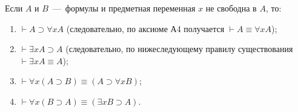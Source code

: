 \begin{lemma}
    Если $A$ и $B$~---~формулы и предметная переменная $x$ не свободна в $A$, то:
    \begin{enumerate}[label=\arabic*)]
        \item $\vdash A \supset \forall xA$ (следовательно, по аксиоме А4 получается $\vdash A \equiv \forall xA$);
        \item $\vdash \exists xA \supset A$ (следовательно, по нижеследующему правилу существования $\vdash \exists xA \equiv A$);
        \item $\vdash \forall x(A \supset B) \equiv (A \supset \forall xB)$;
        \item $\vdash \forall x(B \supset A) \equiv (\exists xB \supset A)$.
    \end{enumerate}
\end{lemma}
